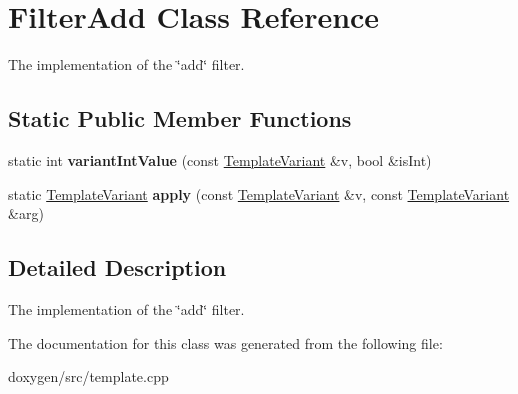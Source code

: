 \hypertarget{class_filter_add}{}\section{Filter\+Add Class Reference}
\label{class_filter_add}


The implementation of the \char`\"{}add\char`\"{} filter.  


\subsection*{Static Public Member Functions}
\begin{DoxyCompactItemize}
\item 
\mbox{\label{class_filter_add_ad95d087e823b91c3aa8d0be706335ace}} 
static int {\bfseries variant\+Int\+Value} (const \mbox{\hyperlink{class_template_variant}{Template\+Variant}} \&v, bool \&is\+Int)
\item 
\mbox{\label{class_filter_add_afb91ff751f43567ef454a175ec95d7a3}} 
static \mbox{\hyperlink{class_template_variant}{Template\+Variant}} {\bfseries apply} (const \mbox{\hyperlink{class_template_variant}{Template\+Variant}} \&v, const \mbox{\hyperlink{class_template_variant}{Template\+Variant}} \&arg)
\end{DoxyCompactItemize}


\subsection{Detailed Description}
The implementation of the \char`\"{}add\char`\"{} filter. 

The documentation for this class was generated from the following file\+:\begin{DoxyCompactItemize}
\item 
doxygen/src/template.\+cpp\end{DoxyCompactItemize}
